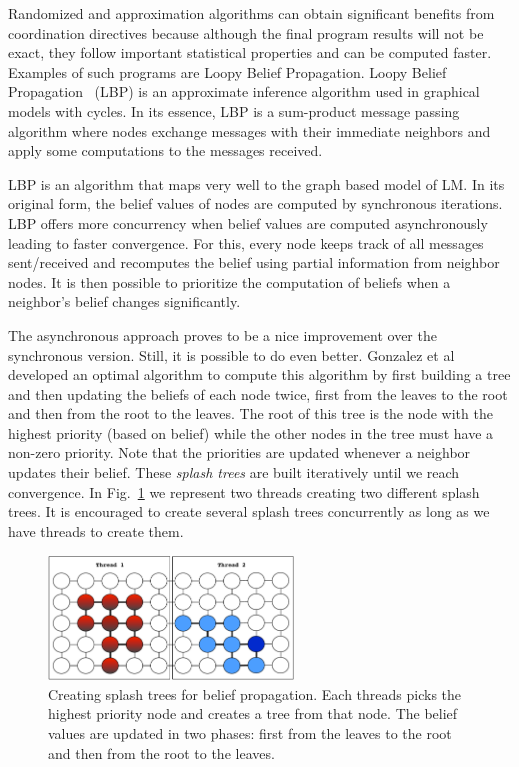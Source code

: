 Randomized and approximation algorithms can obtain significant benefits from
coordination directives because although the final program results will not be
exact, they follow important statistical properties and can be computed faster.
Examples of such programs are Loopy Belief Propagation.
Loopy Belief Propagation~\cite{Murphy99loopybelief} (LBP) is an approximate inference algorithm
used in graphical models with cycles. In its essence, LBP is a sum-product message passing algorithm
where nodes exchange messages with their immediate neighbors and apply some computations to the messages
received.

LBP is an algorithm that maps very well to the graph based model of LM. In its
original form, the belief values of nodes are computed by synchronous iterations.
LBP offers more concurrency when belief values are computed asynchronously
leading to faster convergence. For this, every node keeps track of all messages
sent/received and recomputes the belief using partial information from neighbor
nodes. It is then possible to prioritize the computation of beliefs when a
neighbor's belief changes significantly.

The asynchronous approach proves to be a nice improvement over the synchronous
version. Still, it is possible to do even better. Gonzalez et
al~\cite{Gonzalez+al:aistats09paraml} developed an optimal algorithm to compute
this algorithm by first building a tree and then updating the beliefs of each
node twice, first from the leaves to the root and then from the root to the
leaves. The root of this tree is the node with the highest priority (based on
belief) while the other nodes in the tree must have a non-zero priority.
Note that the priorities are updated whenever a neighbor updates their belief.
These \emph{splash trees} are built iteratively until we reach convergence.
In Fig.~\ref{splash_bp} we represent two threads creating two different splash
trees. It is encouraged to create several splash trees concurrently as long as
we have threads to create them.

\begin{figure}[h!]
   \begin{center}
      \includegraphics[width=6.5cm]{figures/splash_bp}
   \end{center}
   \caption{Creating splash trees for belief propagation. Each threads picks the
   highest priority node and creates a tree from that node. The belief values
   are updated in two phases: first from the leaves to the root and then from
   the root to the leaves.}
   \label{splash_bp}
\end{figure}


